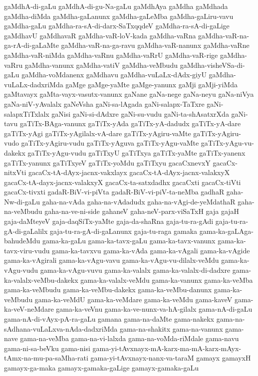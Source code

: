 {gaMdhA-di-gaLu
gaMdhA-di-gu-Na-gaLu
gaMdhAya
gaMdha
gaMdhada
gaMdha-diMda
gaMdha-gaLanunx
gaMdha-gaLeMba
gaMdha-gaLiru-vavu
gaMdha-gaLu
gaMdha-ra-sA-di-darx-SaTxqqdeV
gaMdha-ra-sA-di-gaLige
gaMdhavU
gaMdhavaR
gaMdha-vaR-loV-kada
gaMdha-vaRna
gaMdha-vaR-na-ga-rA-di-gaLaMte
gaMdha-vaR-na-ga-ravu
gaMdha-vaR-nanunx
gaMdha-vaRne
gaMdha-vaR-niMda
gaMdha-vaRnu
gaMdha-vaRrU
gaMdha-vaR-rige
gaMdha-vaRru
gaMdha-vanunx
gaMdha-vatiV
gaMdha-veMbudu
gaMdha-visheVSa-di-gaLu
gaMdha-voMdanenx
gaMdhavu
gaMdha-vuLaLx-dAdx-giyU
gaMdha-vuLaLx-dadxriMda
gaMge
gaMge-yaMte
gaMge-yanunx
gaMji
gaMji-yiMda
gaMtavayx
gaMta-vayx-vasutx-vanunx
gaNane
gaNa-nege
gaNa-neyu
gaNa-niVya
gaNa-niV-yAvalalx
gaNeVsha
gaNi-sa-lAgada
gaNi-salapx-TaTxre
gaNi-salapxTiTxlalx
gaNisi
gaNi-si-dAdxre
gaNi-su-vudu
gaNi-ta-shAsatxrXda
gaNi-tavu
gaTiTx-BAga-vanunx
gaTiTx-yAda
gaTiTx-yA-dadudx
gaTiTx-yA-dare
gaTiTx-yAgi
gaTiTx-yAgilalx-vA-dare
gaTiTx-yAgiru-vaMte
gaTiTx-yAgiru-vudo
gaTiTx-yAgiru-vudu
gaTiTx-yAguva
gaTiTx-yAgu-vaMte
gaTiTx-yAgu-vu-dakekx
gaTiTx-yAgu-vudu
gaTiTxyU
gaTiTxya
gaTiTx-yaMte
gaTiTx-yanenx
gaTiTx-yanunx
gaTiTxyeV
gaTiTx-yoMdu
gaTiTxyu
gacaCxnevxY
gacaCx-nitxVti
gacaCx-tA-dAyx-jacnx-vakxlayx
gacaCx-tA-dAyx-jacnx-valakxyX
gacaCx-tA-dayx-jacnx-valakxyX
gacaCx-ta-satxdadhx
gacaCxti
gacaCx-tiVti
gacaCx-tivxti
gadaR-BiV-vi-piVta
gadaR-BiV-vi-piV-ta-neMba
gadhaR
gaha-Nw-di-gaLu
gaha-na-vAda
gaha-na-vAdadudx
gaha-na-vAgi-de-yeMdathaR
gaha-na-veMbudu
gaha-na-ve-ni-side
gahaneV
gaha-neV-parx-viSaTxH
gaja
gajaH
gaja-daMteyeV
gaja-daqSiTx-yaMte
gaja-da-shaRna
gaja-tu-ra-gAdi
gaja-tu-ra-gA-di-gaLalilx
gaja-tu-ra-gA-di-gaLanunx
gaja-tu-raga
gamaka
gama-ka-gaLAga-bahudeMdu
gama-ka-gaLu
gama-ka-tavx-gaLu
gama-ka-tavx-vanunx
gama-ka-tavx-viru-vudu
gama-ka-tavxvu
gama-ka-vAda
gama-ka-vAgali
gama-ka-vAgide
gama-ka-vAgirali
gama-ka-vAgu-vavu
gama-ka-vAgu-vu-dilalx-veMdu
gama-ka-vAgu-vudu
gama-ka-vAgu-vuvu
gama-ka-valalx
gama-ka-valalx-di-dadxre
gama-ka-valalx-veMbu-dakekx
gama-ka-valalx-veMdu
gama-ka-vanunx
gama-ka-veMba
gama-ka-veMbudu
gama-ka-veMbu-dakekx
gama-ka-veMbu-danunx
gama-ka-veMbudu
gama-ka-veMdU
gama-ka-veMdare
gama-ka-veMdu
gama-kaveV
gama-ka-veV-neMdare
gama-ka-veVnu
gama-ka-ve-nunx-va-hA-gilalx
gama-nA-di-gaLu
gama-nA-di-vAyx-pA-ra-gaLu
gamana
gama-na-daMte
gama-nakekx
gama-na-sAdhana-vuLaLxva-nAda-dadxriMda
gama-na-shakitx
gama-na-vanunx
gama-nave
gama-na-veMba
gama-na-vi-lalxda
gama-na-voMda-riMdale
gama-navu
gama-ni-sa-beVku
gama-nisi
gama-yi-tAvxnayx-mA-karx-ma-mA-karx-mAyx-tAmx-na-mu-pa-saMha-rati
gama-yi-tAvxnayx-nanx-va-taraM
gamayx
gamayxH
gamayx-ga-maka
gamayx-gamaka-gaLige
gamayx-gamaka-gaLu
}
